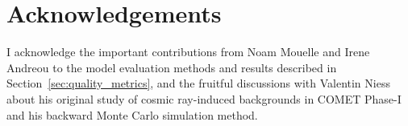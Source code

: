 \chapter*{Acknowledgements}



I acknowledge the important contributions from Noam Mouelle and Irene Andreou to
the model evaluation methods and results described in
Section~\ref{sec:quality_metrics}, and the fruitful discussions with Valentin Niess
about his original study of cosmic ray-induced backgrounds in COMET Phase-I and
his backward Monte Carlo simulation method.